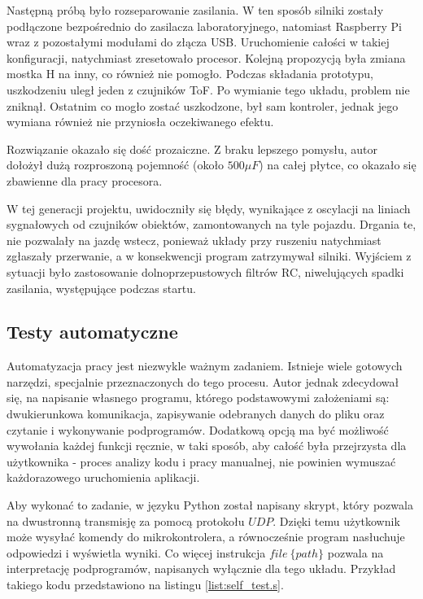         Następną próbą było rozseparowanie zasilania.
        W ten sposób silniki zostały podłączone bezpośrednio do zasilacza laboratoryjnego, natomiast Raspberry Pi wraz z pozostałymi modułami do złącza USB.
        Uruchomienie całości w takiej konfiguracji, natychmiast zresetowało procesor.
        Kolejną propozycją była zmiana mostka H na inny, co również nie pomogło.
        Podczas składania prototypu, uszkodzeniu uległ jeden z czujników ToF.
        Po wymianie tego układu, problem nie zniknął.
        Ostatnim co mogło zostać uszkodzone, był sam kontroler, jednak jego wymiana również nie przyniosła oczekiwanego efektu.

        Rozwiązanie okazało się dość prozaiczne.
        Z braku lepszego pomysłu, autor dołożył dużą rozproszoną pojemność (około $500\mu F$) na całej płytce, co okazało się zbawienne dla pracy procesora.


        W tej generacji projektu, uwidoczniły się błędy, wynikające z oscylacji na liniach sygnałowych od czujników obiektów, zamontowanych na tyle pojazdu.
        Drgania te, nie pozwalały na jazdę wstecz, ponieważ układy przy ruszeniu natychmiast zgłaszały przerwanie, a w konsekwencji program zatrzymywał silniki.
        Wyjściem z sytuacji było zastosowanie dolnoprzepustowych filtrów RC, niwelujących spadki zasilania, występujące podczas startu.



    \subsection{Testy automatyczne}
    \label{sec:auto_test}
        Automatyzacja pracy jest niezwykle ważnym zadaniem.
        Istnieje wiele gotowych narzędzi, specjalnie przeznaczonych do tego procesu.
        Autor jednak zdecydował się, na napisanie własnego programu, którego podstawowymi założeniami są: dwukierunkowa komunikacja, zapisywanie odebranych danych do pliku oraz czytanie i wykonywanie podprogramów.
        Dodatkową opcją ma być możliwość wywołania każdej funkcji ręcznie,
        w taki sposób, aby całość była przejrzysta dla użytkownika - proces analizy kodu i pracy manualnej, nie powinien wymuszać każdorazowego uruchomienia aplikacji.

        Aby wykonać to zadanie, w języku Python został napisany skrypt, który pozwala na dwustronną transmisję za pomocą protokołu $UDP$.
        Dzięki temu użytkownik może wysyłać komendy do mikrokontrolera, a równocześnie program nasłuchuje odpowiedzi i wyświetla wyniki.
        Co więcej instrukcja $file\ \{path\}$ pozwala na interpretację podprogramów, napisanych wyłącznie dla tego układu.
        Przykład takiego kodu przedstawiono na listingu \ref{list:self_test.s}.

